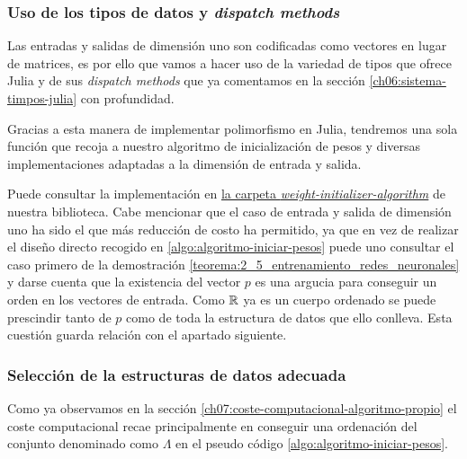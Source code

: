 \subsubsection{ Uso de los tipos de datos y \textit{ dispatch methods}}
Las entradas y salidas de dimensión uno son codificadas como vectores en lugar de matrices, 
es por ello que vamos a hacer uso de la variedad de tipos que ofrece Julia y de sus \textit{dispatch methods} que ya comentamos en 
la sección \ref{ch06:sistema-timpos-julia} con
 profundidad. 

 Gracias a esta manera de implementar polimorfismo 
 en Julia, tendremos una sola función que recoja a 
 nuestro algoritmo de inicialización de pesos y diversas implementaciones adaptadas a la dimensión de entrada y salida. 

 Puede consultar la implementación en \href{https://github.com/BlancaCC/TFG-Estudio-de-las-redes-neuronales/tree/main/Biblioteca-Redes-Neuronales/src}{la carpeta \textit{weight-initializer-algorithm}} de nuestra biblioteca. 
 Cabe mencionar que el caso de entrada y salida de dimensión uno ha sido el que más reducción de costo 
 ha permitido, ya que en vez de realizar 
 el diseño directo recogido en \ref{algo:algoritmo-iniciar-pesos} puede uno consultar 
 el caso primero de la demostración  \ref{teorema:2_5_entrenamiento_redes_neuronales}
 y darse cuenta que la existencia del vector $p$ 
 es una argucia para conseguir un orden en los vectores de entrada. Como $\mathbb{R}$ ya es un cuerpo ordenado se puede prescindir tanto de $p$ como de toda la estructura de datos que ello conlleva. 
 Esta cuestión guarda relación con el apartado siguiente. 

\subsubsection{Selección de la estructuras de datos adecuada}
Como ya observamos en  la sección \ref{ch07:coste-computacional-algoritmo-propio} el coste computacional recae principalmente en conseguir una ordenación del conjunto denominado como 
$\Lambda$ en el pseudo código \ref{algo:algoritmo-iniciar-pesos}. 

